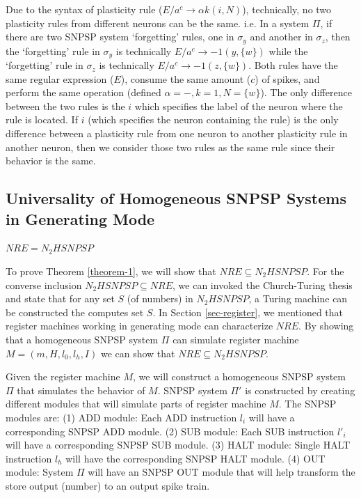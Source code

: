 \documentclass[smallextended]{svjour3}
\begin{document}
Due to the syntax of plasticity rule ($E/a^c \rightarrow \alpha k (i, N)$), technically, no two plasticity rules from different neurons can be the
same. i.e. In a system $\Pi$, if there are two SNPSP system `forgetting' rules, one in $\sigma_y$ and another in $\sigma_z$, then the `forgetting'
rule in $\sigma_y$ is technically  $E/a^c \rightarrow -1(y,\{w\})$ while the `forgetting' rule in $\sigma_z$ is technically $E/a^c \rightarrow -1(z,
\{w\})$. Both rules have the same regular expression ($E$), consume the same amount ($c$) of spikes, and perform the same operation (defined 
$\alpha = -, k=1, N=\{w\}$). The only difference between the two rules is the $i$ which specifies the label of the neuron where the rule is located.
If $i$ (which specifies the neuron containing the rule) is the only difference between a plasticity rule from one neuron to another plasticity rule
in another neuron, then we consider those two rules as the same rule since their behavior is the same.


\subsection{Universality of Homogeneous SNPSP Systems in Generating Mode}\label{sec-gen-mode}

\begin{theorem}\label{theorem-1}
$NRE = N_2HSNPSP$ 
\end{theorem}

\proof To prove Theorem \ref{theorem-1}, we will show that $NRE \subseteq N_2HSNPSP$. For the converse inclusion $N_2HSNPSP \subseteq NRE$, we can
invoked the Church-Turing thesis and state that for any set $S$ (of numbers) in $N_2HSNPSP$, a Turing machine can be constructed the computes set $S$. 
In Section \ref{sec-register}, we mentioned that register machines  working in generating mode can characterize $NRE$. By showing that a homogeneous
SNPSP system $\Pi$ can simulate register machine $M=(m, H, l_0, l_h, I)$ we can show that $NRE \subseteq N_2HSNPSP$.

Given the register machine $M$, we will construct a homogeneous SNPSP system $\Pi$ that simulates the behavior of $M$. SNPSP system $\Pi'$ 
is constructed by creating different modules that will simulate parts of register machine $M$. The SNPSP modules are:
(1)  ADD module: Each ADD instruction $l_i$ will have a corresponding SNPSP ADD module.
(2)  SUB module: Each SUB instruction $l'_i$ will have a corresponding SNPSP SUB module. 
(3)  HALT module: Single HALT instruction $l_h$ will have the corresponding SNPSP HALT module.
(4)  OUT module: System $\Pi$ will have an SNPSP OUT module that will help transform the store output (number) to an output spike train.
\end{document}
